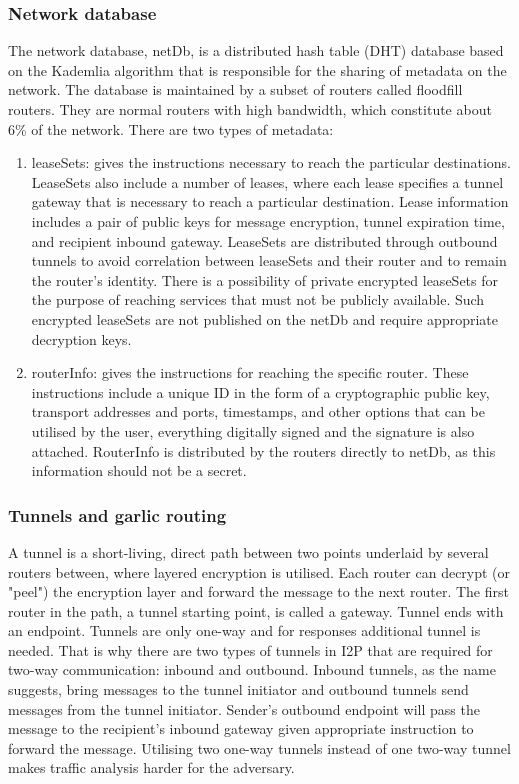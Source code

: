 \subsubsection{Network database}
The network database, netDb, is a distributed hash table (DHT) database based on the Kademlia algorithm that is responsible for the sharing of metadata on the network. The database is maintained by a subset of routers called floodfill routers. They are normal routers with high bandwidth, which constitute about 6\% of the network. There are two types of metadata:
\begin{enumerate}
    \item leaseSets: gives the instructions necessary to reach the particular destinations. LeaseSets also include a number of leases, where each lease specifies a tunnel gateway that is necessary to reach a particular destination. Lease information includes a pair of public keys for message encryption, tunnel expiration time, and recipient inbound gateway. LeaseSets are distributed through outbound tunnels to avoid correlation between leaseSets and their router and to remain the router’s identity.
    There is a possibility of private encrypted leaseSets for the purpose of reaching services that must not be publicly available. Such encrypted leaseSets are not published on the netDb and require appropriate decryption keys.
    \item routerInfo: gives the instructions for reaching the specific router. These instructions include a unique ID in the form of a cryptographic public key,  transport addresses and ports, timestamps, and other options that can be utilised by the user, everything digitally signed and the signature is also attached. RouterInfo is distributed by the routers directly to netDb, as this information should not be a secret.
\end{enumerate}

\subsubsection{Tunnels and garlic routing}
A tunnel is a short-living, direct path between two points underlaid by several routers between, where layered encryption is utilised. Each router can decrypt (or "peel") the encryption layer and forward the message to the next router. The first router in the path, a tunnel starting point, is called a gateway. Tunnel ends with an endpoint. Tunnels are only one-way and for responses additional tunnel is needed. That is why there are two types of tunnels in I2P that are required for two-way communication: inbound and outbound. Inbound tunnels, as the name suggests, bring messages to the tunnel initiator and outbound tunnels send messages from the tunnel initiator. Sender’s outbound endpoint will pass the message to the recipient’s inbound gateway given appropriate instruction to forward the message. Utilising two one-way tunnels instead of one two-way tunnel makes traffic analysis harder for the adversary.

